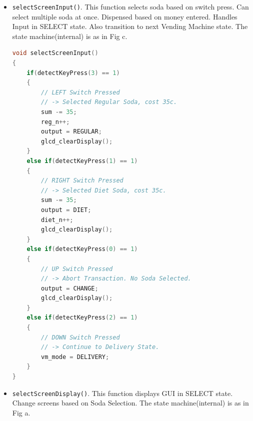 \documentclass{article}
\begin{document}
\begin{itemize}
\begin{lstlisting}[basicstyle = \small, language = C]
        glcd_write(coin);
        displayText("  5c>Press UP    10c>Press DOWN
        25c>Press HAT  Next>Press RIGHT", 4);
        input = NONEI;
        break;
    case DIME:
        // DIME input detected. Total Money 
        // Entered Displayed. Further provision 
        // to enter more coins.
        displayText(digits, 0);
        displayText("Entered
        5c>Press UP     10c>Press DOWN  25c>Press HAT
        Next>Press RIGHT", 1);
        break;
    case NICKEL:
        // NICKEL input detected. Total Money 
        // Entered Displayed. Further provision 
        // to enter more coins.
        displayText(digits, 0);
        displayText("Entered 
        5c>Press UP     10c>Press DOWN  25c>Press HAT
        Next>Press RIGHT", 1);
        break;
    case QUARTER:
        // QUARTER input detected. Total Money 
        // Entered Displayed. Further provision to enter 
        // more coins.
        displayText(digits, 0);
        displayText("Entered
        5c>Press UP     10c>Press DOWN  25c>Press HAT
        Next>Press RIGHT", 1);
        break;
    case NONEI:
        // No Input detected.
        break;
    }
}
  \end{lstlisting}
  \item \texttt{selectScreenInput()}. This function selects soda based on switch press. Can select multiple soda at once. Dispensed based on money entered. Handles Input in SELECT state. Also transition to next Vending Machine state. The state machine(internal) is as in Fig c.
      \begin{lstlisting}[basicstyle = \small, language = C]
void selectScreenInput()
{
    if(detectKeyPress(3) == 1)
    {
        // LEFT Switch Pressed 
        // -> Selected Regular Soda, cost 35c.
        sum -= 35;
        reg_n++;
        output = REGULAR;
        glcd_clearDisplay();
    }
    else if(detectKeyPress(1) == 1)
    {
        // RIGHT Switch Pressed 
        // -> Selected Diet Soda, cost 35c.
        sum -= 35;
        output = DIET;
        diet_n++;
        glcd_clearDisplay();
    }
    else if(detectKeyPress(0) == 1)
    {
        // UP Switch Pressed 
        // -> Abort Transaction. No Soda Selected.
        output = CHANGE;
        glcd_clearDisplay();
    }
    else if(detectKeyPress(2) == 1)
    {
        // DOWN Switch Pressed 
        // -> Continue to Delivery State.
        vm_mode = DELIVERY;
    }
}
  \end{lstlisting}
  \item \texttt{selectScreenDisplay()}. This function displays GUI in SELECT state. Change screens based on Soda Selection. The state machine(internal) is as in Fig a.

\end{itemize}
\end{document}
